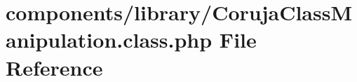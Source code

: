 \hypertarget{_coruja_class_manipulation_8class_8php}{
\section{components/library/CorujaClassManipulation.class.php File Reference}
\label{_coruja_class_manipulation_8class_8php}
}
